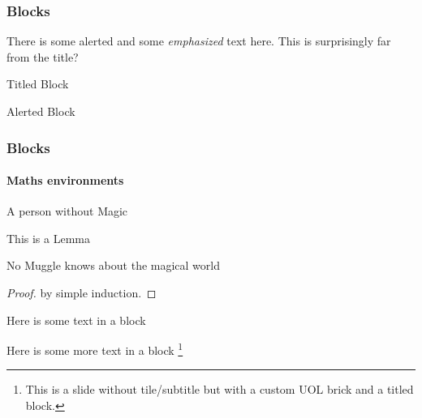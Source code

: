 \documentclass[aspectratio=169]{beamer}
\begin{document}
\begin{frame}
\frametitle{Blocks}
There is some \alert{alerted} and some \emph{emphasized} text here. This is surprisingly far from the title?
\begin{block}{Titled Block}
    \lipsum[1][1-2] 
\end{block}
\begin{alertblock}{Alerted Block}
    \lipsum[1][1-2] 
\end{alertblock}
\begin{example}[Muggle]
\end{example}

\end{frame}
\begin{frame}
\frametitle{Blocks}
\framesubtitle{Maths environments}

\begin{definition}[Muggle]
A person without Magic
\end{definition}

\begin{lemma}
    This is a Lemma
\end{lemma}
\begin{theorem}
No Muggle knows about the magical world
\end{theorem} 
\begin{proof}
    by simple induction.
\end{proof}

\end{frame}

% 
%
\begin{frame}[t]
    \vspace{2cm}
    \begin{block}{Here is some text in a block}
      \lipsum[1][1-5]
    \end{block}
\end{frame}

\begin{frame}[t]
    \vspace{2cm}
    \begin{block}{Here is some more text in a block}
        \lipsum[1][1-5]\footnote{This is a slide without tile/subtitle but with a custom UOL brick and a titled block.}
    \end{block}
\end{frame}
\end{document}
